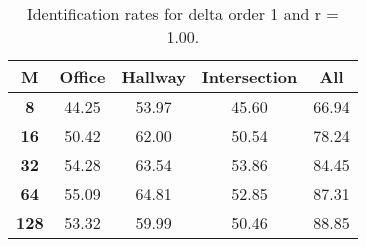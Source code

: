 \begin{table}[h]
    \small
    \centering
    \begin{tabular}{|c|c|c|c|l|}    
    \hline
    {\bf M} & {\bf Office} & {\bf Hallway} & {\bf Intersection} &     \multicolumn{1}{c|}{{\bf All}} \\ \hline
    {\bf 8} & 44.25 & 53.97 & 45.60 & 66.94 \\ \hline
    {\bf 16} & 50.42 & 62.00 & 50.54 & 78.24 \\ \hline
    {\bf 32} & 54.28 & 63.54 & 53.86 & 84.45 \\ \hline
    {\bf 64} & 55.09 & 64.81 & 52.85 & 87.31 \\ \hline
    {\bf 128} & 53.32 & 59.99 & 50.46 & 88.85 \\ \hline
    \end{tabular}
    \caption{Identification rates for delta order 1 and r = 1.00.}    
    \label{tab:identify_speakers_1.00_mit_19_1}
\end{table}
